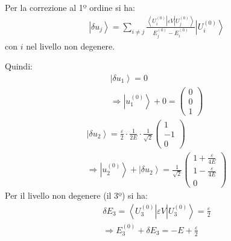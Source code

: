 
Per la correzione al 1º ordine si ha:
\begin{equation}\begin{split}
\left |\delta u_j \right\rangle=\sum_{i\neq j}{\frac{\left\langle U_i^{\left(0\right)}\right |\varepsilon V\left |U_j^{\left(0\right)} \right\rangle}{E_j^{\left(0\right)}-E_i^{\left(0\right)}}\left |U_i^{\left(0\right)} \right\rangle}
\end{split}\end{equation}
con $i$ nel livello non degenere.

Quindi:
\begin{equation}\begin{split}
\left |\delta u_1 \right\rangle=0 \\
\Longrightarrow \left |u_1^{\left(0\right)} \right\rangle+0=\left(\begin{matrix}0\\0\\1\end{matrix}\right)
\end{split}\end{equation}
\begin{equation}\begin{split}
\left |\delta u_2 \right\rangle=\frac{\varepsilon}{2}\cdot \frac{1}{2E}\cdot \frac{1}{\sqrt{2}}\left(\begin{matrix}1\\-1\\0\end{matrix}\right)\\
\Longrightarrow \left |u_2^{\left(0\right)} \right\rangle+\left |\delta u_2 \right\rangle=\frac{1}{\sqrt{2}}\left(\begin{matrix}1+\frac{\varepsilon}{4E}\\1-\frac{\varepsilon}{4E}\\0\end{matrix}\right)
\end{split}\end{equation}
Per il livello non degenere (il 3º) si ha:
\begin{equation}\begin{split}
\delta E_3=\left\langle U_3^{\left(0\right)}\right |\varepsilon V\left |U_3^{\left(0\right)} \right\rangle=\frac{\varepsilon}{2}\\
\Longrightarrow E_3^{\left(0\right)}+\delta E_3=-E+\frac{\varepsilon}{2}
\end{split}\end{equation}
